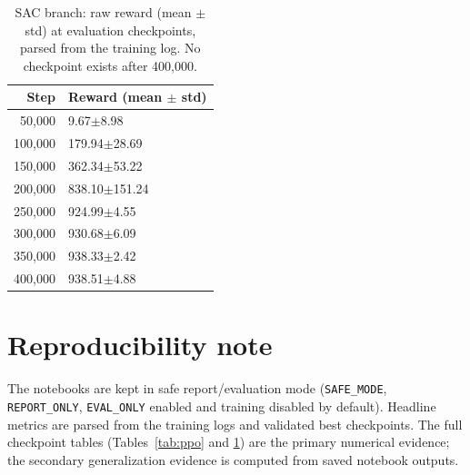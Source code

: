\documentclass[conference]{IEEEtran}
\begin{document}
\begin{table}[t]
\caption{SAC branch: raw reward (mean $\pm$ std) at evaluation checkpoints,
parsed from the training log. No checkpoint exists after 400{,}000.}
\label{tab:sac}
\centering
\small
\begin{tabular}{rl}
\toprule
Step & Reward (mean $\pm$ std) \\
\midrule
50{,}000  & 9.67$\pm$8.98 \\
100{,}000 & 179.94$\pm$28.69 \\
150{,}000 & 362.34$\pm$53.22 \\
200{,}000 & 838.10$\pm$151.24 \\
250{,}000 & 924.99$\pm$4.55 \\
300{,}000 & 930.68$\pm$6.09 \\
350{,}000 & 938.33$\pm$2.42 \\
400{,}000 & 938.51$\pm$4.88 \\
\bottomrule
\end{tabular}
\end{table}

\section{Reproducibility note}
The notebooks are kept in safe report/evaluation mode
(\texttt{SAFE\_MODE}, \texttt{REPORT\_ONLY}, \texttt{EVAL\_ONLY} enabled and
training disabled by default). Headline metrics are parsed from the training
logs and validated best checkpoints. The full checkpoint tables
(Tables~\ref{tab:ppo} and \ref{tab:sac}) are the primary numerical evidence;
the secondary generalization evidence is computed from saved notebook outputs.



\end{document}
